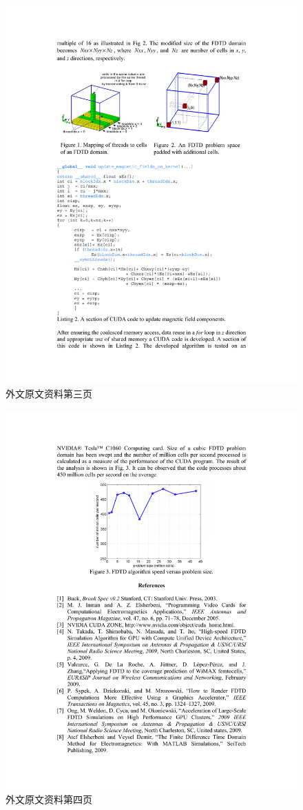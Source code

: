 \begin{figure}[h]
	\centering
	\includegraphics[width=1\linewidth]{../pics/p03}
	\caption{外文原文资料第三页}
	\label{fig:p03}
\end{figure}

\begin{figure}[h]
	\centering
	\includegraphics[width=1\linewidth]{../pics/p04}
	\caption{外文原文资料第四页}
	\label{fig:p04}
\end{figure}